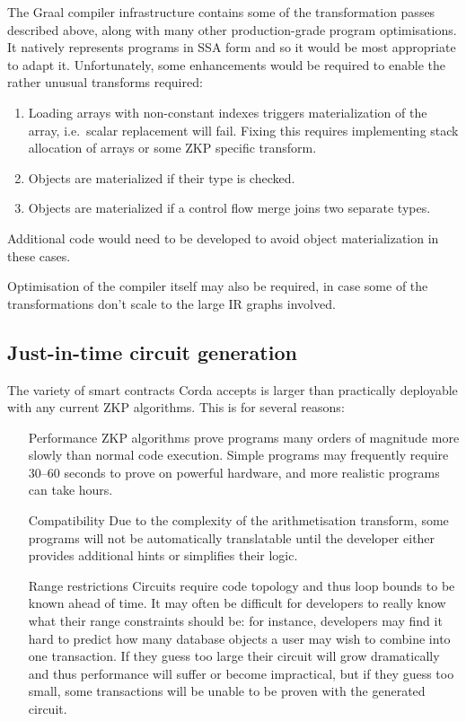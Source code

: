 \documentclass{article}
\begin{document}
The Graal compiler infrastructure contains some of the transformation passes described above, along with many other
production-grade program optimisations. It natively represents programs in SSA form and so it would be most
appropriate to adapt it. Unfortunately, some enhancements would be required to enable the rather unusual transforms
required:

\begin{enumerate}
    \item Loading arrays with non-constant indexes triggers materialization of the array, i.e.\ scalar replacement
          will fail. Fixing this requires implementing stack allocation of arrays or some ZKP specific transform.
    \item Objects are materialized if their type is checked.
    \item Objects are materialized if a control flow merge joins two separate types.
\end{enumerate}

Additional code would need to be developed to avoid object materialization in these cases.

Optimisation of the compiler itself may also be required, in case some of the transformations don't scale to the
large IR graphs involved.

\subsection{Just-in-time circuit generation}

The variety of smart contracts Corda accepts is larger than practically deployable with any current ZKP algorithms.
This is for several reasons:

\begin{itemize}

    \item[Performance] ZKP algorithms prove programs many orders of magnitude more slowly than normal code
    execution. Simple programs may frequently require 30--60 seconds to prove on powerful hardware, and more
    realistic programs can take hours.

    \item[Compatibility] Due to the complexity of the arithmetisation transform, some programs will
    not be automatically translatable until the developer either provides additional hints or simplifies their
    logic.

    \item[Range restrictions] Circuits require code topology and thus loop bounds to be known ahead of time. It may
    often be difficult for developers to really know what their range constraints should be: for instance,
    developers may find it hard to predict how many database objects a user may wish to combine into one
    transaction. If they guess too large their circuit will grow dramatically and thus performance will suffer or
    become impractical, but if they guess too small, some transactions will be unable to be proven with the
    generated circuit.

\end{itemize}
\end{document}
